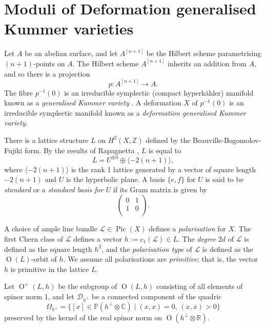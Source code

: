 \documentclass[11pt]{amsart}
\newcommand{\RR}{\mathbb{R}}
\newcommand{\CC}{\mathbb{C}}
\newcommand{\ZZ}{\mathbb{Z}}
\newcommand{\PP}{\mathbb{P}}
\newcommand{\dc}{\mathcal{D}}
\newcommand{\lc}{\mathcal{L}}
\newcommand{\la}{\langle}
\newcommand{\ra}{\rangle}
\newcommand{\opn}{\operatorname}
\newcommand{\op}{\oplus}
\begin{document}
\section{Moduli of Deformation generalised Kummer varieties}
Let $A$ be an abelian surface, and let $A^{[n+1]}$ be the Hilbert scheme parametrising $(n+1)$-points on $A$.
The Hilbert scheme $A^{[n+1]}$ inherits an addition from $A$, and so there is a projection 
\begin{equation*}
p:A^{[n+1]} \rightarrow A.
\end{equation*}
The fibre $p^{-1}(0)$ is an irreducible symplectic (compact hyperk\"ahler) manifold known as a \emph{generalised Kummer variety} \cite{beauvillesexamples}.
A deformation $X$ of $p^{-1}(0)$ is an irreducible symplectic manifold known as a \emph{deformation generalised Kummer variety}.

There is a lattice structure $L$ on $H^2(X, \ZZ)$ defined by the Beauville-Bogomolov-Fujiki \cite{beauvillesexamples} form.
By the results of Rapagnetta \cite{rapagnetta2}, $L$ is equal to 
\begin{equation*}
L=U^{\op 3} \op \la -2(n+1) \ra,
\end{equation*}
where $\la -2(n+1) \ra$ is the rank 1 lattice generated by a vector of square length $-2(n+1)$ and  $U$ is the hyperbolic plane.
A basis $\{e, f\}$ for $U$ is said to be \emph{standard} or a \emph{standard basis for $U$} if its  Gram matrix is given by
\begin{equation*}
\begin{pmatrix}
0 & 1 \\
1 & 0 \\
\end{pmatrix}.
\end{equation*}

A choice of ample line bundle $\lc \in \opn{Pic}(X)$ defines a \emph{polarisation} for $X$.
The first Chern class of $\lc$ defines a vector $h:=c_1(\lc) \in L$.
The \emph{degree} $2d$ of $\lc$ is defined as the square length $h^2$, and the \emph{polarisation type} of $\lc$ is defined as the $\opn{O}(L)$-orbit of $h$.
We assume all polarisations are \emph{primitive}; that is, the vector $h$ is primitive in the lattice $L$.

Let $\opn{O}^+(L, h)$ be the subgroup of $\opn{O}(L, h)$ consisting of all elements of spinor norm 1, and let $\dc_{h^{\perp}}$ be a connected component of the quadric
\begin{equation*} 
\Omega_{h^{\perp}}=\{[x] \in \PP(h^{\perp} \otimes \CC) \mid \text{$(x,x)=0$, $(x, \overline{x})>0$} \}
\end{equation*}
preserved by the kernel of the real spinor norm on $\opn{O}(h^{\perp} \otimes \RR)$.
\end{document}
